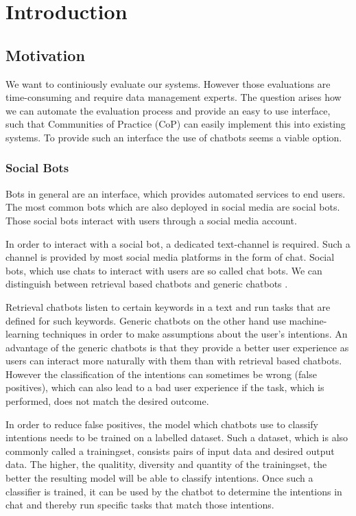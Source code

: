 \chapter{Introduction}

\section{Motivation}
We want to continiously evaluate our systems. However those evaluations are time-consuming and require data management experts. The question arises how we can automate the evaluation process and provide an easy to use interface, such that Communities of Practice (CoP) can easily implement this into existing systems.
To provide such an interface the use of chatbots seems a viable option.

\subsection{Social Bots}
Bots in general are an interface, which provides automated services to end users. The most common bots which are also deployed in social media are social bots. Those social bots interact with users through a social media account.

In order to interact with a social bot, a dedicated text-channel is required. Such a channel is provided by most social media platforms in the form of chat. Social bots, which use chats to interact with users are so called chat bots. We can distinguish between retrieval based chatbots and generic chatbots \cite{NLKl19}.

Retrieval chatbots listen to certain keywords in a text and run tasks that are defined for such keywords. Generic chatbots on the other hand use machine-learning techniques in order to make assumptions about the user's intentions. An advantage of the generic chatbots is that they provide a better user experience as users can interact more naturally with them than with retrieval based chatbots. However the classification of the intentions can sometimes be wrong (false positives), which can also lead to a bad user experience if the task, which is performed, does not match the desired outcome.

In order to reduce false positives, the model which chatbots use to classify intentions needs to be trained on a labelled dataset. Such a dataset, which is also commonly called a trainingset, consists pairs of input data and desired output data. The higher, the qualitity, diversity and quantity of the trainingset, the better the resulting model will be able to classify intentions.
Once such a classifier is trained, it can be used by the chatbot to determine the intentions in chat and thereby run specific tasks that match those intentions.

